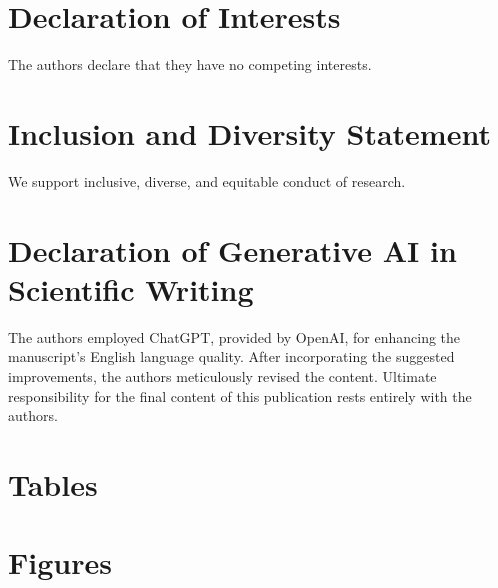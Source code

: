 \documentclass[preprint,review,12pt]{elsarticle}%
\begin{document}
\section*{Declaration of Interests}
The authors declare that they have no competing interests.
\label{declaration of interests}

\section*{Inclusion and Diversity Statement}
We support inclusive, diverse, and equitable conduct of research.
\label{inclusion and diversity statement}

\section*{Declaration of Generative AI in Scientific Writing}
The authors employed ChatGPT, provided by OpenAI, for enhancing the manuscript's English language quality. After incorporating the suggested improvements, the authors meticulously revised the content. Ultimate responsibility for the final content of this publication rests entirely with the authors.
\label{declaration of generative ai in scientific writing}


\clearpage
\section*{Tables}
\label{tables}


\clearpage
\section*{Figures}
\label{figures}
\end{document}
